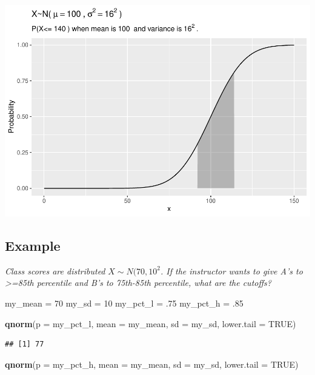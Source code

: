 \documentclass[
]{book}
\newenvironment{Shaded}{\begin{snugshade}}{\end{snugshade}}
\newcommand{\DataTypeTok}[1]{\textcolor[rgb]{0.13,0.29,0.53}{#1}}
\newcommand{\DecValTok}[1]{\textcolor[rgb]{0.00,0.00,0.81}{#1}}
\newcommand{\FloatTok}[1]{\textcolor[rgb]{0.00,0.00,0.81}{#1}}
\newcommand{\KeywordTok}[1]{\textcolor[rgb]{0.13,0.29,0.53}{\textbf{#1}}}
\newcommand{\NormalTok}[1]{#1}
\newcommand{\OtherTok}[1]{\textcolor[rgb]{0.56,0.35,0.01}{#1}}
\newcommand{\StringTok}[1]{\textcolor[rgb]{0.31,0.60,0.02}{#1}}
\begin{document}
\includegraphics{data-sci_files/figure-latex/unnamed-chunk-23-1.pdf}

\hypertarget{example-13}{%
\subsection{Example}\label{example-13}}

\emph{Class scores are distributed }\(X \sim N(70, 10^2\)\emph{. If the instructor wants to give A's to \textgreater=85th percentile and B's to 75th-85th percentile, what are the cutoffs?}

\begin{Shaded}
\begin{Highlighting}[]
\NormalTok{my_mean =}\StringTok{ }\DecValTok{70}
\NormalTok{my_sd =}\StringTok{ }\DecValTok{10}
\NormalTok{my_pct_l =}\StringTok{ }\FloatTok{.75}
\NormalTok{my_pct_h =}\StringTok{ }\FloatTok{.85}

\KeywordTok{qnorm}\NormalTok{(}\DataTypeTok{p =}\NormalTok{ my_pct_l, }\DataTypeTok{mean =}\NormalTok{ my_mean, }\DataTypeTok{sd =}\NormalTok{ my_sd, }\DataTypeTok{lower.tail =} \OtherTok{TRUE}\NormalTok{)}
\end{Highlighting}
\end{Shaded}

\begin{verbatim}
## [1] 77
\end{verbatim}

\begin{Shaded}
\begin{Highlighting}[]
\KeywordTok{qnorm}\NormalTok{(}\DataTypeTok{p =}\NormalTok{ my_pct_h, }\DataTypeTok{mean =}\NormalTok{ my_mean, }\DataTypeTok{sd =}\NormalTok{ my_sd, }\DataTypeTok{lower.tail =} \OtherTok{TRUE}\NormalTok{)}
\end{Highlighting}
\end{Shaded}
\end{document}
